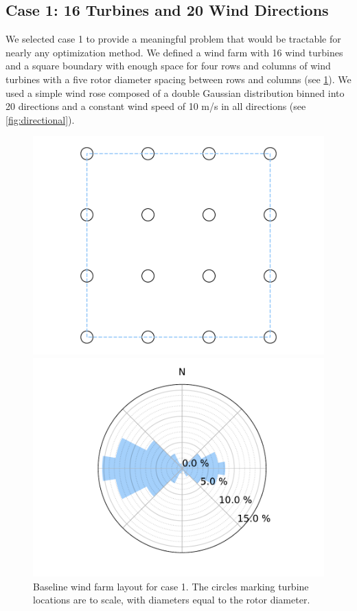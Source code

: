 \documentclass{jpconf}
\begin{document}
\subsection{Case 1: 16 Turbines and 20 Wind Directions}
We selected case 1 to provide a meaningful problem that would be tractable for nearly any optimization method. We defined a wind farm with 16 wind turbines and a square boundary with enough space for four rows and columns of wind turbines with a five rotor diameter spacing between rows and columns (see \cref{fig:layout1}). We used a simple wind rose composed of a double Gaussian distribution binned into 20 directions and a constant wind speed of 10 m/s in all directions (see \cref{fig:directional}).
\begin{figure}[h!]
\centering
\begin{minipage}[t]{18pc}
\centering
\includegraphics[width=1.\textwidth, trim={1.5cm, 0cm, 1.5cm, 0cm}, clip]{final_images/layouts/16_turb_start.pdf}
\caption{Baseline wind farm layout for case 1. The circles marking turbine locations are to scale, with diameters equal to the rotor diameter.}
\label{fig:layout1}
\end{minipage}\hspace{1pc}%
\begin{minipage}[t]{18pc}
\centering
\includegraphics[width=\textwidth, trim={2.0cm 0cm 2.0cm 0cm}, clip]{final_images/windroses/freqwindrose_20_dir.pdf}

\end{minipage}
\end{figure}
\end{document}
